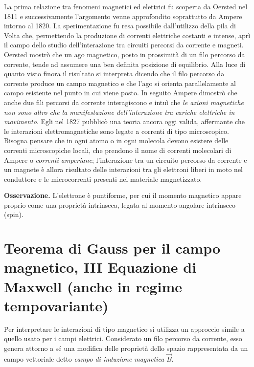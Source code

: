 La prima relazione tra fenomeni magnetici ed elettrici fu scoperta da Oersted nel 1811 e successivamente l'argomento venne approfondito soprattutto da Ampere intorno al 1820. La sperimentazione fu resa possibile dall'utilizzo della pila di Volta che, permettendo la produzione di correnti elettriche costanti e intense, aprì il campo dello studio dell'interazione tra circuiti percorsi da corrente e magneti. Oersted mostrò che un ago magnetico, posto in prossimità di un filo percorso da corrente, tende ad assumere una ben definita posizione di equilibrio. Alla luce di quanto visto finora il risultato si interpreta dicendo che il filo percorso da corrente produce un campo magnetico e che l'ago si orienta parallelamente al campo esistente nel punto in cui viene posto. In seguito Ampere dimostrò che anche due fili percorsi da corrente interagiscono e intuì che \emph{le azioni magnetiche non sono altro che la manifestazione dell'interazione tra cariche elettriche in movimento}. Egli nel 1827 pubblicò una teoria ancora oggi valida, affermante che le interazioni elettromagnetiche sono legate a correnti di tipo microscopico. Bisogna pensare che in ogni atomo o in ogni molecola devono esistere delle correnti microscopiche locali, che prendono il nome di correnti molecolari di Ampere o \emph{correnti amperiane}; l'interazione tra un circuito percorso da corrente e un magnete è allora risultato delle interazioni tra gli elettroni liberi in moto nel conduttore e le microcorrenti presenti nel materiale magnetizzato.

\textbf{Osservazione.} L'elettrone è puntiforme, per cui il momento magnetico appare proprio come una proprietà intrinseca, legata al momento angolare intrinseco (spin).

\section{Teorema di Gauss per il campo magnetico, III Equazione di Maxwell (anche in regime tempovariante)}

Per interpretare le interazioni di tipo magnetico si utilizza un approccio simile a quello usato per i campi elettrici. Considerato un filo percorso da corrente, esso genera attorno a sé una modifica delle proprietà dello spazio rappresentata da un campo vettoriale detto \emph{campo di induzione magnetica} $\vec{B}$.

